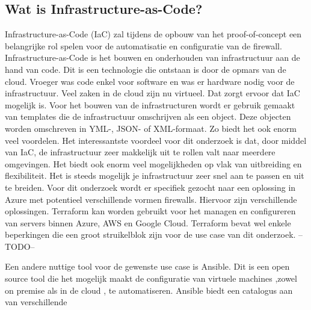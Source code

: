 \subsection*{Wat is Infrastructure-as-Code?}
Infrastructure-as-Code (IaC) zal tijdens de opbouw van het proof-of-concept een belangrijke rol spelen voor de automatisatie en configuratie van de firewall. Infrastructure-as-Code is het bouwen en onderhouden van infrastructuur aan de hand van code. Dit is een technologie die ontstaan is door de opmars van de cloud. Vroeger was code enkel voor software en was er hardware nodig voor de infrastructuur. Veel zaken in de cloud zijn nu virtueel. Dat zorgt ervoor dat IaC mogelijk is. Voor het bouwen van de infrastructuren wordt er gebruik gemaakt van templates die de infrastructuur omschrijven als een object. Deze objecten worden omschreven in YML-, JSON- of XML-formaat. Zo biedt het ook enorm veel voordelen. Het interessantste voordeel voor dit onderzoek is dat, door middel van IaC, de infrastructuur zeer makkelijk uit te rollen valt naar meerdere omgevingen. \autocite{Bulthuis} Het biedt ook enorm veel mogelijkheden op vlak van uitbreiding en flexibiliteit. Het is steeds mogelijk je infrastructuur zeer snel aan te passen en uit te breiden. \autocite{Morris2016}  Voor dit onderzoek wordt er specifiek gezocht naar een oplossing in Azure met potentieel verschillende vormen firewalls. 
Hiervoor zijn verschillende oplossingen. Terraform kan worden gebruikt voor het managen en configureren van servers binnen Azure, AWS en Google Cloud. \autocite{IONOS2019} \autocite{Janashia2020} Terraform bevat wel enkele beperkingen die een groot struikelblok zijn voor de use case van dit onderzoek. --TODO--

Een andere nuttige tool voor de gewenste use case is Ansible. Dit is een open source tool die het mogelijk maakt de configuratie van virtuele machines ,zowel on premise als in de cloud , te automatiseren. \autocite{Hat} Ansible biedt een catalogus aan van verschillende 



